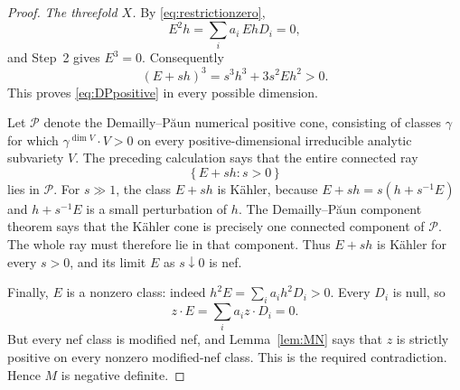 \documentclass[10pt,a4paper]{amsart}
\begin{document}
\begin{proof}
\emph{The threefold $X$.}
By \eqref{eq:restrictionzero},
\[
 E^2h=\sum_i a_i\,EhD_i=0,
\]
and Step~2 gives $E^3=0$.  Consequently
\[
 (E+sh)^3=s^3h^3+3s^2Eh^2>0.
\]
This proves \eqref{eq:DPpositive} in every possible dimension.

Let $\mathcal P$ denote the Demailly--P\u{a}un numerical positive
cone, consisting of classes $\gamma$ for which
$\gamma^{\dim V}\cdot V>0$ on every positive-dimensional irreducible
analytic subvariety $V$.  The preceding calculation says that the
entire connected ray
\[
 \{\,E+sh:s>0\,\}
\]
lies in $\mathcal P$.  For $s\gg1$, the class $E+sh$ is K\"ahler,
because $E+sh=s(h+s^{-1}E)$ and $h+s^{-1}E$ is a small perturbation
of $h$.  The Demailly--P\u{a}un component theorem says that the
K\"ahler cone is precisely one connected component of $\mathcal P$.
The whole ray must therefore lie in that component.  Thus $E+sh$ is
K\"ahler for every $s>0$, and its limit $E$ as $s\downarrow0$ is
nef.

Finally, $E$ is a nonzero class: indeed
$h^2E=\sum_i a_i h^2D_i>0$.  Every $D_i$ is null, so
\[
 z\cdot E=\sum_i a_i z\cdot D_i=0.
\]
But every nef class is modified nef, and Lemma~\ref{lem:MN} says that
$z$ is strictly positive on every nonzero modified-nef class.  This is
the required contradiction.  Hence $M$ is negative definite.
\end{proof}
\end{document}
